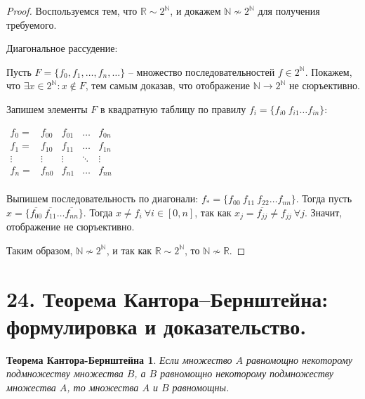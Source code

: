 \documentclass[a4paper, 12pt]{article}
\newtheorem*{cantorbern}{Теорема Кантора-Бернштейна}
\newcommand{\N}{\mathbb{N}}
\newcommand{\R}{\mathbb{R}}
\begin{document}
\begin{proof}

Воспользуемся тем, что $\R \sim 2^{\N}$, и докажем $\N \nsim 2^{\N}$ для получения требуемого.
    
    Диагональное рассудение:
    
    Пусть $F = \{f_0, f_1, \ldots , f_n, \ldots \}$ -- множество последовательностей $f \in 2^{\N}$. Покажем, что $\exists x \in 2^{\N} : x \notin F$, тем самым доказав, что отображение $\N \to 2^{\N}$ не сюръективно.
    
    Запишем элементы $F$ в квадратную таблицу по правилу $f_i = \{f_{i0} \ f_{i1} \ldots f_{in}\}$:
    
    $\begin{array}{lcccr}
        f_0 = & f_{00} & f_{01} & \ldots & f_{0n}\\
        f_1 = & f_{10} & f_{11} & \ldots & f_{1n}\\
        \vdots & \vdots & \vdots & \ddots & \vdots \\
        f_n = & f_{n0} & f_{n1} & \ldots & f_{nn}\\
    \end{array}$
    
    Выпишем последовательность по диагонали: $f_{*} = \{f_{00} \ f_{11} \ f_{22} \ldots f_{n n}\}$. Тогда пусть $x = \{\overline{f_{00}} \ \overline{f_{11}} \ldots \overline{f_{n n}}\}$. Тогда $x \neq f_{i} \  \forall i \in [0, n]$, так как $x_{j} = \overline{f_{j j}} \neq f_{j j} \ \forall j$. Значит, отображение не сюръективно.
    
    Таким образом, $\N \nsim 2^{\N}$, и так как $\R \sim 2^{\N}$, то $\N \nsim \R$.
        
\end{proof}

\section*{24. Теорема Кантора–Бернштейна: формулировка и доказательство.}

\begin{cantorbern}
    Если множество $A$ равномощно некоторому подмножеству множества $B$, а $B$ равномощно некоторому подмножеству множества $A$, то множества $A$ и $B$ равномощны.
\end{cantorbern}
\end{document}
